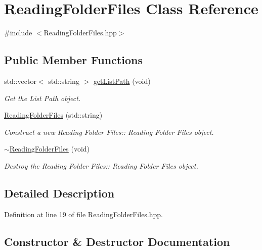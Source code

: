 \hypertarget{class_reading_folder_files}{}\section{Reading\+Folder\+Files Class Reference}
\label{class_reading_folder_files}


{\ttfamily \#include $<$Reading\+Folder\+Files.\+hpp$>$}

\subsection*{Public Member Functions}
\begin{DoxyCompactItemize}
\item 
std\+::vector$<$ std\+::string $>$ \hyperlink{class_reading_folder_files_ae4eb52dbef433f34d5ccee66ebc02855}{get\+List\+Path} (void)
\begin{DoxyCompactList}\small\item\em Get the List Path object. \end{DoxyCompactList}\item 
\hyperlink{class_reading_folder_files_acd130d6bcf3f4b864e4658136c743b10}{Reading\+Folder\+Files} (std\+::string)
\begin{DoxyCompactList}\small\item\em Construct a new Reading Folder Files\+:\+: Reading Folder Files object. \end{DoxyCompactList}\item 
\hyperlink{class_reading_folder_files_a59560f57a763b2acfe78663a54f9c343}{$\sim$\+Reading\+Folder\+Files} (void)
\begin{DoxyCompactList}\small\item\em Destroy the Reading Folder Files\+:\+: Reading Folder Files object. \end{DoxyCompactList}\end{DoxyCompactItemize}


\subsection{Detailed Description}


Definition at line 19 of file Reading\+Folder\+Files.\+hpp.



\subsection{Constructor \& Destructor Documentation}
\mbox{\label{class_reading_folder_files_acd130d6bcf3f4b864e4658136c743b10}} 
